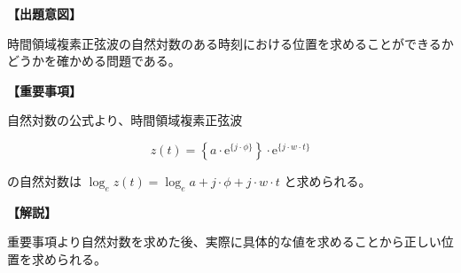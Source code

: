 \noindent \textbf{【出題意図】}

\bigskip
\noindent 時間領域複素正弦波の自然対数のある時刻における位置を求めることができるかどうかを確かめる問題である。

\vspace{1em}
\noindent \textbf{【重要事項】}

\medskip
\noindent 自然対数の公式より、時間領域複素正弦波 

\[
z(t) =  \left \{ a \cdot \textrm{e}^{\{j \cdot \phi\}} \right \} 
\cdot \textrm{e}^{\{j \cdot w \cdot t \}}
\]

\bigskip
\noindent の自然対数は $\log_e z(t) =  \log_e a + j \cdot \phi + j \cdot w \cdot t$ と求められる。

\bigskip

\vspace{1em}
\noindent \textbf{【解説】}

\bigskip
\noindent 重要事項より自然対数を求めた後、実際に具体的な値を求めることから正しい位置を求められる。
